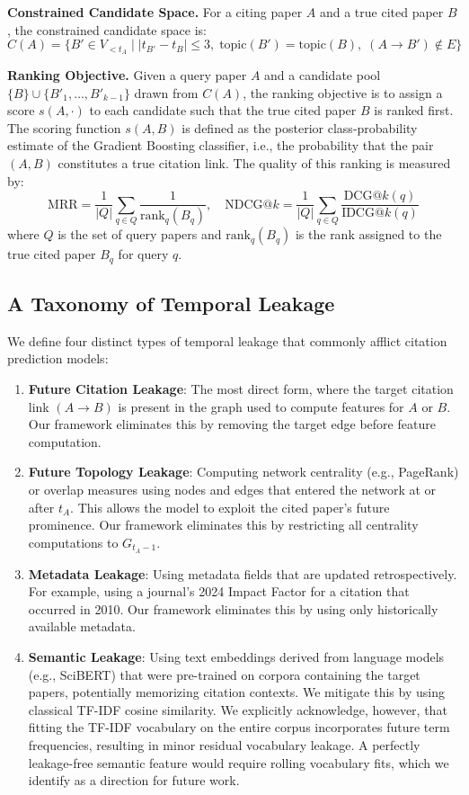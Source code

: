 \documentclass[11pt,a4paper]{article}
\begin{document}
\textbf{Constrained Candidate Space.} For a citing paper $A$ and a true cited paper $B$, the constrained candidate space is:
\[
C(A) = \{B' \in V_{<t_A} \mid |t_{B'} - t_B| \le 3, \; \text{topic}(B') = \text{topic}(B), \; (A \to B') \notin E\}
\]

\textbf{Ranking Objective.} Given a query paper $A$ and a candidate pool $\{B\} \cup \{B'_1, \ldots, B'_{k-1}\}$ drawn from $C(A)$, the ranking objective is to assign a score $s(A, \cdot)$ to each candidate such that the true cited paper $B$ is ranked first. The scoring function $s(A, B)$ is defined as the posterior class-probability estimate of the Gradient Boosting classifier, i.e., the probability that the pair $(A, B)$ constitutes a true citation link. The quality of this ranking is measured by:
\[
\text{MRR} = \frac{1}{|Q|}\sum_{q \in Q} \frac{1}{\text{rank}_q(B_q)}, \quad \text{NDCG@}k = \frac{1}{|Q|}\sum_{q \in Q} \frac{\text{DCG@}k(q)}{\text{IDCG@}k(q)}
\]
where $Q$ is the set of query papers and $\text{rank}_q(B_q)$ is the rank assigned to the true cited paper $B_q$ for query $q$.

\subsection{A Taxonomy of Temporal Leakage}
We define four distinct types of temporal leakage that commonly afflict citation prediction models:

\begin{enumerate}
    \item \textbf{Future Citation Leakage}: The most direct form, where the target citation link $(A \to B)$ is present in the graph used to compute features for $A$ or $B$. Our framework eliminates this by removing the target edge before feature computation.
    \item \textbf{Future Topology Leakage}: Computing network centrality (e.g., PageRank) or overlap measures using nodes and edges that entered the network at or after $t_A$. This allows the model to exploit the cited paper's future prominence. Our framework eliminates this by restricting all centrality computations to $G_{t_A-1}$.
    \item \textbf{Metadata Leakage}: Using metadata fields that are updated retrospectively. For example, using a journal's 2024 Impact Factor for a citation that occurred in 2010. Our framework eliminates this by using only historically available metadata.
    \item \textbf{Semantic Leakage}: Using text embeddings derived from language models (e.g., SciBERT) that were pre-trained on corpora containing the target papers, potentially memorizing citation contexts. We mitigate this by using classical TF-IDF cosine similarity. We explicitly acknowledge, however, that fitting the TF-IDF vocabulary on the entire corpus incorporates future term frequencies, resulting in minor residual vocabulary leakage. A perfectly leakage-free semantic feature would require rolling vocabulary fits, which we identify as a direction for future work.
\end{enumerate}
\end{document}
